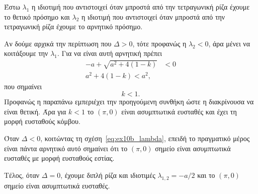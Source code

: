 \begin{solution}
    Έστω \( \lambda_1 \) η ιδιοτιμή που αντιστοιχεί όταν μπροστά από την
    τετραγωνική ρίζα έχουμε το θετικό πρόσημο και \( \lambda_2 \) η ιδιοτιμή
    που αντιστοιχεί όταν μπροστά από την τετραγωνική ρίζα έχουμε το αρνητικό
    πρόσημο.

    Αν δούμε αρχικά την περίπτωση που \( \Delta > 0 \), τότε προφανώς η \(
    \lambda_2 < 0 \), άρα μένει να κοιτάξουμε την \( \lambda_1 \). Για να είναι
    αυτή αρνητική πρέπει
    \begin{align*}
        -a + \sqrt{a^2 + 4(1 - k)} &< 0 \\
        a^2 + 4(1 - k) < a^2,
    \end{align*}
    που σημαίνει
    \[
        k < 1.
    \]
    Προφανώς η παραπάνω εμπεριέχει την προηγούμενη συνθήκη ώστε η διακρίνουσα να
    είναι θετική. Άρα για \( k < 1 \) το \( (\pi, 0) \) είναι ασυμπτωτικά
    ευσταθές και έχει τη μορφή ευσταθούς κόμβου.

    Όταν \( \Delta < 0 \), κοιτώντας τη σχέση~\eqref{eq:ex10b_lambda}, επειδή το
    πραγματικό μέρος είναι πάντα αρνητικό αυτό σημαίνει ότι το \( (\pi, 0) \) σημείο
    είναι ασυμπτωτικά ευσταθές με μορφή ευσταθούς εστίας.

    Τέλος, όταν \( \Delta = 0 \), έχουμε διπλή ρίζα και ιδιοτιμές \(
    \lambda_{1,2} = -a/2 \) και το \( (\pi, 0) \) σημείο είναι ασυμπτωτικά
    ευσταθές.


\end{solution}
